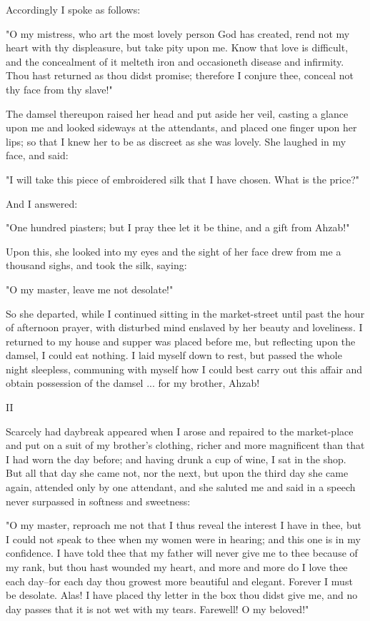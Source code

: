 Accordingly I spoke as follows:

"O my mistress, who art the most lovely person God has created, rend
not my heart with thy displeasure, but take pity upon me. Know that
love is difficult, and the concealment of it melteth iron and
occasioneth disease and infirmity. Thou hast returned as thou didst
promise; therefore I conjure thee, conceal not thy face from thy
slave!"

The damsel thereupon raised her head and put aside her veil, casting
a glance upon me and looked sideways at the attendants, and placed one
finger upon her lips; so that I knew her to be as discreet as she was
lovely. She laughed in my face, and said:

"I will take this piece of embroidered silk that I have chosen. What
is the price?"

And I answered:

"One hundred piasters; but I pray thee let it be thine, and a gift
from Ahzab!"

Upon this, she looked into my eyes and the sight of her face drew from
me a thousand sighs, and took the silk, saying:

"O my master, leave me not desolate!"

So she departed, while I continued sitting in the market-street until
past the hour of afternoon prayer, with disturbed mind enslaved by her
beauty and loveliness. I returned to my house and supper was placed
before me, but reflecting upon the damsel, I could eat nothing. I laid
myself down to rest, but passed the whole night sleepless, communing
with myself how I could best carry out this affair and obtain
possession of the damsel ... for my brother, Ahzab!


II

Scarcely had daybreak appeared when I arose and repaired to the
market-place and put on a suit of my brother's clothing, richer and
more magnificent than that I had worn the day before; and having drunk
a cup of wine, I sat in the shop. But all that day she came not, nor
the next, but upon the third day she came again, attended only by one
attendant, and she saluted me and said in a speech never surpassed in
softness and sweetness:

"O my master, reproach me not that I thus reveal the interest I have
in thee, but I could not speak to thee when my women were in hearing;
and this one is in my confidence. I have told thee that my father will
never give me to thee because of my rank, but thou hast wounded my
heart, and more and more do I love thee each day--for each day thou
growest more beautiful and elegant. Forever I must be desolate. Alas!
I have placed thy letter in the box thou didst give me, and no day
passes that it is not wet with my tears. Farewell! O my beloved!"


